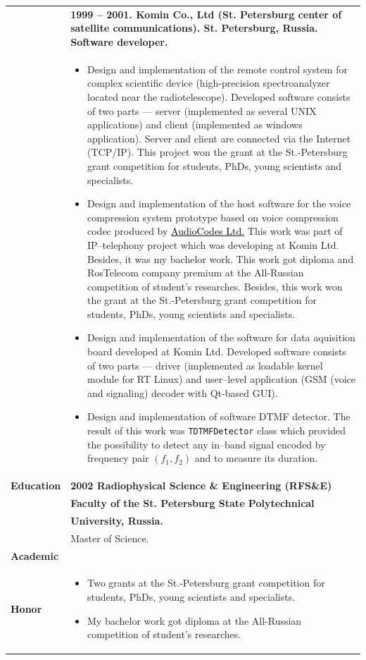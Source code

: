 \documentclass[a4paper]{article}
\newcommand{\myhref}[2]{\href{#1}{\textcolor{black}{#2}}}
\begin{document}
\newpage

\begin{tabular}{lp{12cm}}
& \bf 1999 -- 2001. Komin Co., Ltd (St. Petersburg center of satellite communications). St. Petersburg, Russia. Software developer.\\[-.5cm]
& \begin{itemize}
\item Design and implementation
of the remote control system for complex scientific device 
(high-precision spectroanalyzer located near the radiotelescope).
Developed software consists of two parts --- server (implemented as several
UNIX applications) and client (implemented as windows application).
Server and client are connected via the Internet (TCP/IP). 
This project won the grant at the St.-Petersburg grant
competition for students, PhDs, young scientists  and specialists.
\item Design and implementation of the host software for the  
voice compression system prototype based on voice compression codec produced by
\myhref{http://www.audiocodes.com}{AudioCodes Ltd.}
This work was part of IP--telephony project which was developing at 
Komin Ltd.  Besides, it was my bachelor work.  
This work got diploma and RosTelecom company premium at the All-Russian 
competition of student's researches.
Besides, this work won the grant at the St.-Petersburg grant competition
for students, PhDs, young scientists  and specialists.
\item Design and implementation of the software for data aquisition board
developed at Komin Ltd.
Developed software consists of two parts --- driver (implemented as loadable 
kernel module for RT Linux) and user--level application (GSM (voice and signaling) decoder with
Qt-based GUI).
\item Design and implementation of software DTMF 
detector.  The result of this work was \texttt{TDTMFDetector}
class which provided the possibility
to detect any in--band signal encoded by frequency pair $(f_1, f_2)$ and
to measure its duration.
\end{itemize}\\
\bf Education& \bf 2002  Radiophysical Science \& Engineering (RFS\&E)\\
& \bf Faculty of the  St. Petersburg State Polytechnical\\
& \bf University, Russia.\\
& Master of Science.\\
\bf Academic\\
\bf Honor & \vspace*{-1cm}\begin{itemize}
\item Two grants at the St.-Petersburg grant competition
for students, PhDs, young scientists  and specialists.
\item My bachelor work got diploma at the All-Russian competition of student's researches.
\end{itemize}
\end{tabular}
\end{document}

